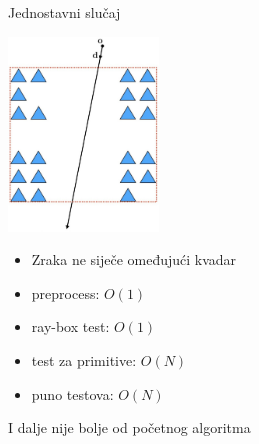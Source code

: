 \documentclass[9pt]{beamer}
\begin{document}
\begin{frame}{Jednostavni slučaj}
	\begin{center}
		\includegraphics[width=0.3\textwidth]{slike/slide_014.jpg}
	\end{center}
	\begin{itemize}
		\item Zraka ne siječe omeđujući kvadar
		\item preprocess: $O(1)$
		\item ray-box test: $O(1)$
		\item test za primitive: $O(N)$
		\item puno testova: $O(N)$
	\end{itemize}
I dalje nije bolje od početnog algoritma
\end{frame}
\end{document}
